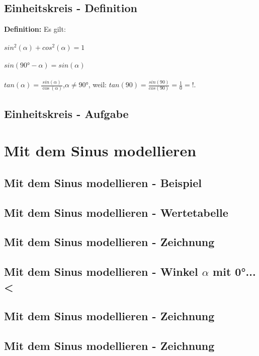 \documentclass[12pt,a4paper]{article}
\begin{document}
\subsection{Einheitskreis - Definition}
\textbf{Definition:} Es gilt:
\paragraph{}
$sin^2(\alpha) + cos^2(\alpha) = 1$
\paragraph{}
$sin(90° - \alpha) = sin(\alpha)$
\paragraph{}
$tan(\alpha) = \frac{sin(\alpha)}{\cos(\alpha)}$,$\alpha \neq 90°$, weil: 
$tan(90)=\frac{sin(90)}{cos(90)} = \frac{1}{0} = !$.
\subsection{Einheitskreis - Aufgabe}

\newpage
\section{Mit dem Sinus modellieren}
\subsection{Mit dem Sinus modellieren - Beispiel}
\subsection{Mit dem Sinus modellieren - Wertetabelle}
\subsection{Mit dem Sinus modellieren - Zeichnung}

\subsection{Mit dem Sinus modellieren - Winkel $\alpha$ mit 0°...<}
\subsection{Mit dem Sinus modellieren - Zeichnung}
\subsection{Mit dem Sinus modellieren - Zeichnung}
\end{document}

